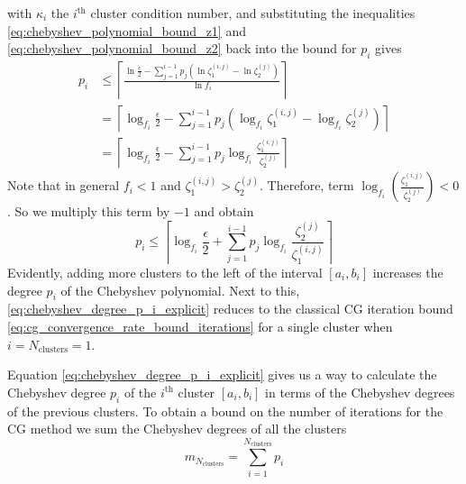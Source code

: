 with $\kappa_i$ the $i^{\text{th}}$ cluster condition number, and substituting the inequalities \ref{eq:chebyshev_polynomial_bound_z1} and \ref{eq:chebyshev_polynomial_bound_z2} back into the bound for $p_i$ gives
\begin{align*}
    p_i & \leq \left\lceil\frac{\ln{\frac{\epsilon}{2}} - \sum_{j=1}^{i-1} p_j\left(\ln{\zeta^{(i,j)}_1} - \ln{\zeta^{(j)}_2} \right)}{\ln{f_i}}\right\rceil  \\
        & = \left\lceil\log_{f_i}{\frac{\epsilon}{2}} - \sum_{j=1}^{i-1} p_j\left(\log_{f_i}{\zeta^{(i,j)}_1} - \log_{f_i}{\zeta^{(j)}_2} \right)\right\rceil \\
        & = \left\lceil\log_{f_i}{\frac{\epsilon}{2}} - \sum_{j=1}^{i-1} p_j\log_{f_i}{\frac{\zeta^{(i,j)}_1}{\zeta^{(j)}_2}} \right\rceil
\end{align*}
Note that in general $f_i < 1$ and $\zeta^{(i,j)}_1 > \zeta^{(j)}_2$. Therefore, term $\log_{f_i}{\left(\frac{\zeta^{(i,j)}_1}{\zeta^{(j)}_2}\right)} < 0$. So we multiply this term by $-1$ and obtain
\begin{equation}
    p_i \leq \left\lceil\log_{f_i}{\frac{\epsilon}{2}} + \sum_{j=1}^{i-1} p_j\log_{f_i}{\frac{\zeta^{(j)}_2}{\zeta^{(i,j)}_1}} \right\rceil
    \label{eq:chebyshev_degree_p_i_explicit}
\end{equation}
Evidently, adding more clusters to the left of the interval $[a_i,b_i]$ increases the degree $p_i$ of the Chebyshev polynomial. Next to this, \cref{eq:chebyshev_degree_p_i_explicit} reduces to the classical CG iteration bound \cref{eq:cg_convergence_rate_bound_iterations} for a single cluster when $i = N_{\text{clusters}} = 1$.

Equation \ref{eq:chebyshev_degree_p_i_explicit} gives us a way to calculate the Chebyshev degree $p_i$ of the $i^{\text{th}}$ cluster $[a_i,b_i]$ in terms of the Chebyshev degrees of the previous clusters. To obtain a bound on the number of iterations for the CG method we sum the Chebyshev degrees of all the clusters
\begin{equation}
    m_{N_{\text{clusters}}} = \sum_{i=1}^{N_{\text{clusters}}} p_i
    \label{eq:cg_iteration_bound_multiple_clusters}
\end{equation}

